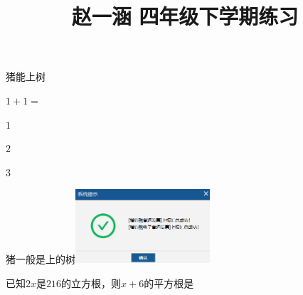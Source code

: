 \documentclass{exam-zh}
\title{赵一涵 四年级下学期练习}\subject{四则混合运算}
\begin{document}
\maketitle\begin{question}猪能上树\paren\end{question}\begin{question}$1+1=$\paren\begin{choices}\item $1$\item $2$\item $3$\end{choices}\end{question}\begin{question}猪一般是上\fillin[]的树\newline \includegraphics[width=5cm]{test.png}\end{question}\begin{question}已知$2x$是$216$的立方根，则$x+6$的平方根是\underline{\hspace{1cm}}\end{question}
\end{document}
